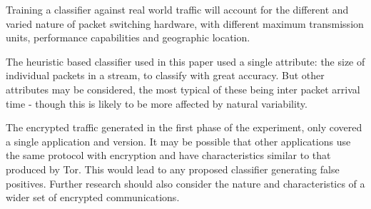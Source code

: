 Training a classifier against real world traffic will account for the different
and varied nature of packet switching hardware, with different maximum
transmission units, performance capabilities and geographic location.

The heuristic based classifier used in this paper used a single attribute: the
size of individual packets in a stream, to classify with great accuracy. But
other attributes may be considered, the most typical of these being inter
packet arrival time - though this is likely to be more affected by natural
variability.

The encrypted traffic generated in the first phase of the experiment, only
covered a single application and version. It may be possible that other
applications use the same protocol with encryption and have characteristics
similar to that produced by Tor. This would lead to any proposed classifier
generating false positives. Further research should also consider the nature
and characteristics of a wider set of encrypted communications.
